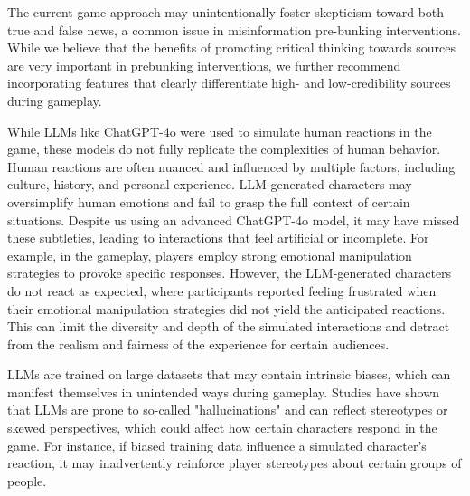 The current game approach may unintentionally foster skepticism toward both true and false news, a common issue in misinformation pre-bunking interventions\cite{hameleers2023intended,modirrousta2023gamified}. %
While we believe that the benefits of promoting critical thinking towards sources are very important in prebunking interventions,
we further recommend incorporating features that clearly differentiate high- and low-credibility sources during gameplay.

While LLMs like ChatGPT-4o were used to simulate human reactions in the game, these models do not fully replicate the complexities of human behavior. Human reactions are often nuanced and influenced by multiple factors, including culture, history, and personal experience. LLM-generated characters may oversimplify human emotions and fail to grasp the full context of certain situations. Despite us using an advanced ChatGPT-4o model, it may have missed these subtleties, leading to interactions that feel artificial or incomplete. For example, in the gameplay, players employ strong emotional manipulation strategies to provoke specific responses. However, the LLM-generated characters do not react as expected, where participants reported feeling frustrated when their emotional manipulation strategies did not yield the anticipated reactions. This can limit the diversity and depth of the simulated interactions and detract from the realism and fairness of the experience for certain audiences.

LLMs are trained on large datasets that may contain intrinsic biases, which can manifest themselves in unintended ways during gameplay\cite{kasneci2023chatgpt}. Studies have shown that LLMs are prone to so-called "hallucinations" and can reflect stereotypes or skewed perspectives, which could affect how certain characters respond in the game\cite{xie2024can}. For instance, if biased training data influence a simulated character’s reaction, it may inadvertently reinforce player stereotypes about certain groups of people. 


